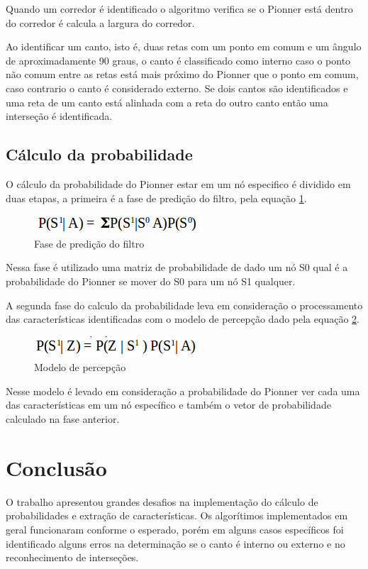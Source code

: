 \documentclass{llncs}
\begin{document}
Quando um corredor é identificado o algoritmo verifica se o Pionner está dentro do corredor é calcula a largura do corredor.

Ao identificar um canto, isto é, duas retas com um ponto em comum e um ângulo de aproximadamente 90 graus, o canto é classificado como interno caso o ponto não comum entre as retas está mais próximo do Pionner que o ponto em comum, caso contrario o canto é considerado externo. Se dois cantos são identificados e uma reta de um canto está alinhada com a reta do outro canto então uma interseção é identificada.

\subsection{Cálculo da probabilidade}
O cálculo da probabilidade do Pionner estar em um nó especifico é dividido em duas etapas, a primeira é a fase de predição do filtro, pela equação \ref{fig:eq1}.

\begin{figure}
	\centerline{\includegraphics[scale=0.7]{eq1}}
	\caption{Fase de predição do filtro}
	\label{fig:eq1}
\end{figure}

Nessa fase é utilizado uma matriz de probabilidade de dado um nó S0 qual é a probabilidade do Pionner se mover do S0 para um nó S1 qualquer.

A segunda fase do calculo da probabilidade leva em consideração o processamento das características identificadas com o modelo de percepção dado pela equação \ref{fig:eq2}.

\begin{figure}
	\centerline{\includegraphics[scale=0.7]{eq2}}
	\caption{Modelo de percepção}
	\label{fig:eq2}
\end{figure}

Nesse modelo é levado em consideração a probabilidade do Pionner ver cada uma das características em um nó específico e também o vetor de probabilidade calculado na fase anterior.


\section{Conclusão}
O trabalho apresentou grandes desafios na implementação do cálculo de probabilidades e extração de características. Os algorítimos implementados em geral funcionaram conforme o esperado, porém em alguns casos específicos foi identificado alguns erros na determinação se o canto é interno ou externo e no reconhecimento de interseções.
\end{document}
